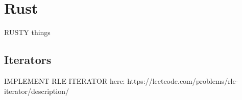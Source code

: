 
\chapter{Rust}

RUSTY things


\section{Iterators}

IMPLEMENT RLE ITERATOR here: https://leetcode.com/problems/rle-iterator/description/